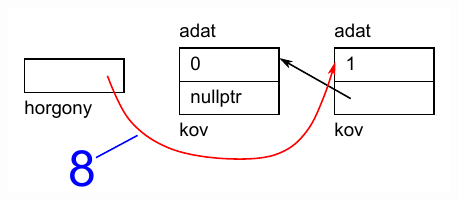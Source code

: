 \begin{frame}
  \begin{columns}[c]
      \begin{exampleblock}{}
        
      \end{exampleblock}
      \includegraphics[width=\textwidth]{verem/verem09.pdf}
  \end{columns}
\end{frame}
